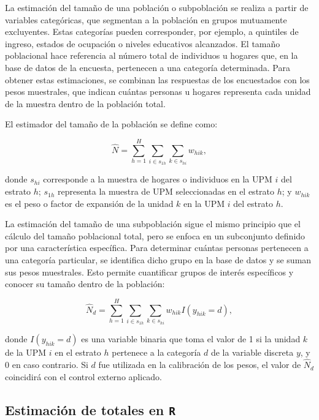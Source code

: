 \documentclass[
  spanish,
  12pt,
]{book}
\begin{document}
La estimación del tamaño de una población o subpoblación se realiza a partir de variables categóricas, que segmentan a la población en grupos mutuamente excluyentes. Estas categorías pueden corresponder, por ejemplo, a quintiles de ingreso, estados de ocupación o niveles educativos alcanzados. El tamaño poblacional hace referencia al número total de individuos u hogares que, en la base de datos de la encuesta, pertenecen a una categoría determinada. Para obtener estas estimaciones, se combinan las respuestas de los encuestados con los pesos muestrales, que indican cuántas personas u hogares representa cada unidad de la muestra dentro de la población total.

El estimador del tamaño de la población se define como:

\[\hat{N} = \sum_{h=1}^{H} \sum_{i \in s_{1h}} \sum_{k \in s_{hi}} w_{hik},\]

donde \(s_{hi}\) corresponde a la muestra de hogares o individuos en la UPM \(i\) del estrato \(h\); \(s_{1h}\) representa la muestra de UPM seleccionadas en el estrato \(h\); y \(w_{hik}\) es el peso o factor de expansión de la unidad \(k\) en la UPM \(i\) del estrato \(h\).

La estimación del tamaño de una subpoblación sigue el mismo principio que el cálculo del tamaño poblacional total, pero se enfoca en un subconjunto definido por una característica específica. Para determinar cuántas personas pertenecen a una categoría particular, se identifica dicho grupo en la base de datos y se suman sus pesos muestrales. Esto permite cuantificar grupos de interés específicos y conocer su tamaño dentro de la población:

\[\hat{N}_d = \sum_{h=1}^{H} \sum_{i \in s_{1h}} \sum_{k \in s_{hi}} w_{hik} I(y_{hik}=d),\]

donde \(I(y_{hik}=d)\) es una variable binaria que toma el valor de 1 si la unidad \(k\) de la UPM \(i\) en el estrato \(h\) pertenece a la categoría \(d\) de la variable discreta \(y\), y 0 en caso contrario. Si \(d\) fue utilizada en la calibración de los pesos, el valor de \(\hat{N}_d\) coincidirá con el control externo aplicado.

\subsection*{\texorpdfstring{Estimación de totales en \texttt{R}}{Estimación de totales en R}}\label{estimaciuxf3n-de-totales-en-r}
\end{document}
